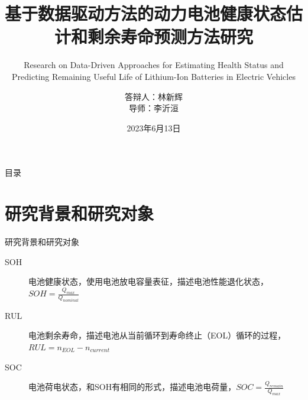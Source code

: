 \documentclass{beamer}
\author[林新辉]{答辩人：林新辉 \\ [5mm] 导师：李沂洹}
\title{基于数据驱动方法的动力电池健康状态估计和剩余寿命预测方法研究}
\subtitle{Research on Data-Driven Approaches for Estimating Health Status and Predicting Remaining Useful Life of Lithium-Ion Batteries in Electric Vehicles}
\institute{控制与计算机工程学院，华北电力大学}
\date{2023年6月13日}
\begin{document}
\kaishu
\begin{frame}
\titlepage
\end{frame}

\begin{frame}{\small 目录}
\tableofcontents[sectionstyle=show,subsectionstyle=show/shaded/hide,subsubsectionstyle=show/shaded/hide]
\end{frame}

\section{研究背景和研究对象}

\begin{frame}{\small 研究背景和研究对象}
	\begin{figure}[htbp]    %
		  \centering            %
		\end{figure}
	\begin{description}
		\item[SOH]
		电池健康状态，使用电池放电容量表征，描述电池性能退化状态，$SOH = \frac{Q_{max}}{Q_{nominal}}$
		\item[RUL]
		电池剩余寿命，描述电池从当前循环到寿命终止（EOL）循环的过程，$RUL = n_{EOL} - n_{current}$
		\item[SOC]
		电池荷电状态，和SOH有相同的形式，描述电池电荷量，$SOC = \frac{Q_{remain}}{Q_{max}}$
	\end{description}
\end{frame}
\end{document}
